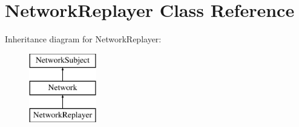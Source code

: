 \hypertarget{classNetworkReplayer}{
\section{NetworkReplayer Class Reference}
\label{classNetworkReplayer}
}
Inheritance diagram for NetworkReplayer:\begin{figure}[H]
\begin{center}
\leavevmode
\includegraphics[height=3.000000cm]{classNetworkReplayer}
\end{center}
\end{figure}
